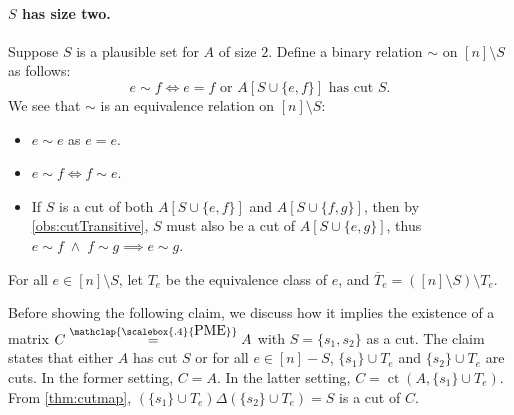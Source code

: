 \documentclass[11pt,letterpaper]{article}
\newcommand{\comp}[1]{\overline{#1}}
\newtheorem{claim}{Claim}[section]
\DeclareMathOperator{\calP}{\mathcal{P}}
\newcommand{\pp}[2]{\{\{#1\},\{#2\}\}}
\DeclareMathOperator*{\ct}{ct}
\newcommand{\PME}{\stackrel{\mathclap{\scalebox{.4}{\mbox{PME}}}}{=}}
\begin{document}
{{{

\paragraph{$S$ has size two.}
Suppose $S$ is a plausible set for $A$ of size $2$. Define a binary relation $\sim$ on $[n] \setminus S$ as follows:
\[ e \sim f \iff e=f \text{ or } A[S \cup \{e,f\}] \text{ has cut } S\text{.}\]
We see that $\sim$ is an equivalence relation on $[n] \setminus S$:
\begin{itemize}
    \item $e \sim e$ as $e = e$.
    \item $e \sim f \iff f \sim e$. 
    \item If $S$ is a cut of both $A[S \cup \{e,f\}]$ and $A[S \cup \{f,g\}]$, then by \cref{obs:cutTransitive}, $S$ must also be a cut of $A[S \cup \{e,g\}]$, thus $e \sim f\;\wedge\;f \sim g \implies e \sim g$.
\end{itemize}
For all $e \in [n] \setminus S$, let $T_e$ be the equivalence class of $e$, and $\comp{T}_e = ([n] \setminus S) \setminus T_e$.

Before showing the following claim, we discuss how it implies the existence of a matrix $C\PME A$ with $S=\{s_1,s_2\}$ as a cut. The claim states that either $A$ has cut $S$ or for all $e\in [n]-S$, $\{s_1\}\cup T_e$ and $\{s_2\} \cup T_e$ are cuts. In the former setting, $C=A$. In the latter setting, $C=\ct(A,\{s_1\}\cup T_e)$. From \cref{thm:cutmap}, $(\{s_1\}\cup T_e)\Delta (\{s_2\}\cup T_e)=S$ is a cut of $C$.


}}}
\end{document}
